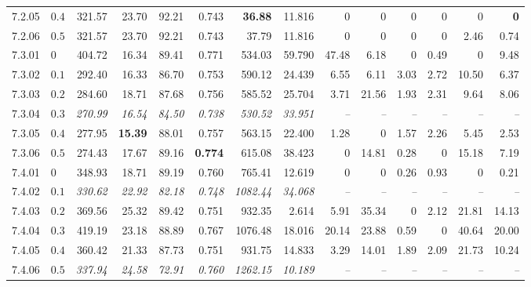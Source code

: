 \begin{table}[!t]
\begin{tabular}{@{}llrrrrrrrrrrrr@{}}
    7.2.05 & \underline{$0.4$} & 321.57 & 23.70 & 92.21 & 0.743 & \textbf{36.88} & 11.816 & 0 & 0 & 0 & 0 & 0 & \textbf{0} \\
    7.2.06 & $0.5$ & 321.57 & 23.70 & 92.21 & 0.743 & 37.79 & 11.816 & 0 & 0 & 0 & 0 & 2.46 & 0.74 \\
    7.3.01 & $0$ & 404.72 & 16.34 & 89.41 & 0.771 & 534.03 & 59.790 & 47.48 & 6.18 & 0 & 0.49 & 0 & 9.48 \\
    7.3.02 & $0.1$ & 292.40 & 16.33 & 86.70 & 0.753 & 590.12 & 24.439 & 6.55 & 6.11 & 3.03 & 2.72 & 10.50 & 6.37 \\
    7.3.03 & $0.2$ & 284.60 & 18.71 & 87.68 & 0.756 & 585.52 & 25.704 & 3.71 & 21.56 & 1.93 & 2.31 & 9.64 & 8.06 \\
    7.3.04 & $0.3$ & \textit{270.99} & \textit{16.54} & \textit{84.50} & \textit{0.738} & \textit{530.52} & \textit{33.951} & \textit{--} & \textit{--} & \textit{--} & \textit{--} & \textit{--} & \textit{--} \\
    7.3.05 & $0.4$ & 277.95 & \textbf{15.39} & 88.01 & 0.757 & 563.15 & 22.400 & 1.28 & 0 & 1.57 & 2.26 & 5.45 & 2.53 \\
    7.3.06 & $0.5$ & 274.43 & 17.67 & 89.16 & \textbf{0.774} & 615.08 & 38.423 & 0 & 14.81 & 0.28 & 0 & 15.18 & 7.19 \\
    7.4.01 & $0$ & 348.93 & 18.71 & 89.19 & 0.760 & 765.41 & 12.619 & 0 & 0 & 0.26 & 0.93 & 0 & 0.21 \\
    7.4.02 & $0.1$ & \textit{330.62} & \textit{22.92} & \textit{82.18} & \textit{0.748} & \textit{1082.44} & \textit{34.068} & \textit{--} & \textit{--} & \textit{--} & \textit{--} & \textit{--} & \textit{--} \\
    7.4.03 & $0.2$ & 369.56 & 25.32 & 89.42 & 0.751 & 932.35 & 2.614 & 5.91 & 35.34 & 0 & 2.12 & 21.81 & 14.13 \\
    7.4.04 & $0.3$ & 419.19 & 23.18 & 88.89 & 0.767 & 1076.48 & 18.016 & 20.14 & 23.88 & 0.59 & 0 & 40.64 & 20.00 \\
    7.4.05 & $0.4$ & 360.42 & 21.33 & 87.73 & 0.751 & 931.75 & 14.833 & 3.29 & 14.01 & 1.89 & 2.09 & 21.73 & 10.24 \\
    7.4.06 & $0.5$ & \textit{337.94} & \textit{24.58} & \textit{72.91} & \textit{0.760} & \textit{1262.15} & \textit{10.189} & \textit{--} & \textit{--} & \textit{--} & \textit{--} & \textit{--} & \textit{--} \\
\hline
\end{tabular}
\end{table}